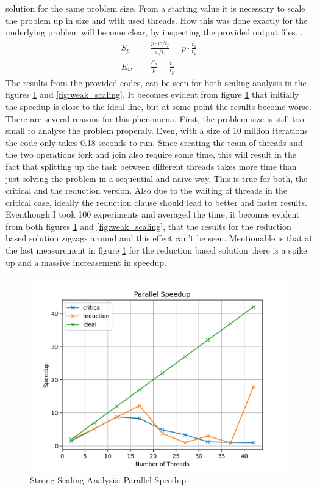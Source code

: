 \documentclass[unicode,11pt,a4paper,oneside,numbers=endperiod,openany]{scrartcl}
\begin{document}
solution for the same problem size. From a starting value it is necessary to scale the problem up in size and with used threads. How this 
was done exactly for the underlying problem will become clear, by inspecting the provided output files. \cite{HPC}, \cite{scaling}
\begin{align*}
  S_{p} &= \frac{p \cdot w/t_p}{w/t_1} = p \cdot \frac{t_1}{t_p}\\
  E_{w} &= \frac{S_p}{p} = \frac{t_1}{t_p}
\end{align*}
\indent
The results from the provided codes, can be seen for both scaling analysis in the figures \ref{fig:strong_scaling} and \ref{fig:weak_scaling}.
It becomes evident from figure \ref{fig:strong_scaling} that initially the speedup is close to the ideal line, but at some point the results 
become worse. There are several reasons for this phenomena. First, the problem size is still too small to analyse the problem properaly. Even, 
with a size of 10 million iterations the code only takes 0.18 seconds to run. Since creating the team of threads and the two operations fork and 
join also require some time, this will result in the fact that splitting up the task between different threads takes more time than just 
solving the problem in a sequential and naive way. This is true for both, the critical and the reduction version. Also due to the waiting 
of threads in the critical case, ideally the reduction clause should lead to better and faster results. Eventhough I took 100 experiments and 
averaged the time, it becomes evident from both figures \ref{fig:strong_scaling} and \ref{fig:weak_scaling}, that the results for the 
reduction based solution zigzags around and this effect can't be seen. Mentionable is that at the last measurement in figure \ref{fig:strong_scaling} 
for the reduction based solution there is a spike up and a massive increasement in speedup.
\begin{figure}[H]
    \centering
    \includegraphics[width=\textwidth]{Images_Output/parallel_speedup.png}
    \caption{Strong Scaling Analysis: Parallel Speedup}
    \label{fig:strong_scaling}
  \end{figure}
\end{document}
